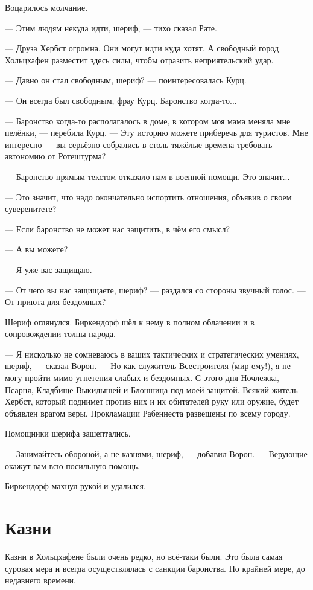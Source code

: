 Воцарилось молчание.

--- Этим людям некуда идти, шериф, --- тихо сказал Рате.

--- Друза Хербст огромна.
Они могут идти куда хотят.
А свободный город Хольцхафен разместит здесь силы, чтобы отразить неприятельский удар.

--- Давно он стал свободным, шериф? --- поинтересовалась Курц.

--- Он всегда был свободным, фрау Курц.
Баронство когда-то...

--- Баронство когда-то располагалось в доме, в котором моя мама меняла мне пелёнки, --- перебила Курц.
--- Эту историю можете приберечь для туристов.
Мне интересно --- вы серьёзно собрались в столь тяжёлые времена требовать автономию от Ротештурма?

--- Баронство прямым текстом отказало нам в военной помощи.
Это значит...

--- Это значит, что надо окончательно испортить отношения, объявив о своем суверенитете?

--- Если баронство не может нас защитить, в чём его смысл?

--- А вы можете?

--- Я уже вас защищаю.

--- От чего вы нас защищаете, шериф? --- раздался со стороны звучный голос.
--- От приюта для бездомных?

Шериф оглянулся.
Биркендорф шёл к нему в полном облачении и в сопровождении толпы народа.

--- Я нисколько не сомневаюсь в ваших тактических и стратегических умениях, шериф, --- сказал Ворон.
--- Но как служитель Всестроителя (мир ему!), я не могу пройти мимо угнетения слабых и бездомных.
С этого дня Ночлежка, Псарня, Кладбище Выкидышей и Блошница под моей защитой.
Всякий житель Хербст, который поднимет против них и их обитателей руку или оружие, будет объявлен врагом веры.
Прокламации Рабеннеста развешены по всему городу.

Помощники шерифа зашептались.

--- Занимайтесь обороной, а не казнями, шериф, --- добавил Ворон.
--- Верующие окажут вам всю посильную помощь.

Биркендорф махнул рукой и удалился.

\section{Казни}

Казни в Хольцхафене были очень редко, но всё-таки были.
Это была самая суровая мера и всегда осуществлялась с санкции баронства.
По крайней мере, до недавнего времени.

